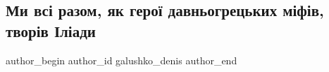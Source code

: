  
 
 
 
 

\subsection{Ми всі разом, як герої давньогрецьких міфів, творів Іліади}
\label{sec:30_09_2022.fb.galushko_denis.1.mi_vs__razom__yak_ge}

\ifcmt
 author_begin
   author_id galushko_denis
 author_end
\fi
